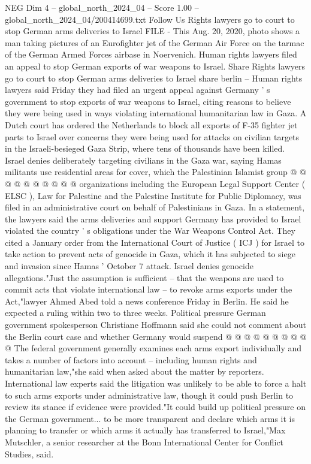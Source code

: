 \begin{textsample}{NEG Dim 4 – global\_north\_2024\_04 – Score 1.00 – global\_north\_2024\_04/200414699.txt}  \label{ex:f4_neg_095}
Follow Us Rights lawyers go to court to stop German arms deliveries to Israel FILE - This Aug. 20, 2020, photo shows a man taking pictures of an Eurofighter jet of the German Air Force on the tarmac of the German Armed Forces airbase in Noervenich.
Human rights lawyers filed an appeal to stop German exports of war weapons to Israel.
Share Rights lawyers go to court to stop German arms deliveries to Israel share berlin -- Human rights lawyers said Friday they had filed an urgent appeal against Germany ' s government to stop exports of war weapons to Israel, citing reasons to believe they were being used in ways violating international humanitarian law in Gaza.
A Dutch court has ordered the Netherlands to block all exports of F-35 fighter jet parts to Israel over concerns they were being used for attacks on civilian targets in the Israeli-besieged Gaza Strip, where tens of thousands have been killed.
Israel denies deliberately targeting civilians in the Gaza war, saying Hamas militants use residential areas for cover, which the Palestinian Islamist group @ @ @ @ @ @ @ @ @ @ organizations including the European Legal Support Center ( ELSC ), Law for Palestine and the Palestine Institute for Public Diplomacy, was filed in an administrative court on behalf of Palestinians in Gaza.
In a statement, the lawyers said the arms deliveries and support Germany has provided to Israel violated the country ' s obligations under the War Weapons Control Act.
They cited a January order from the International Court of Justice ( ICJ ) for Israel to take action to prevent acts of genocide in Gaza, which it has subjected to siege and invasion since Hamas ' October 7 attack.
Israel denies genocide allegations."Just the assumption is sufficient -- that the weapons are used to commit acts that violate international law -- to revoke arms exports under the Act,"lawyer Ahmed Abed told a news conference Friday in Berlin.
He said he expected a ruling within two to three weeks.
Political pressure German government spokesperson Christiane Hoffmann said she could not comment about the Berlin court case and whether Germany would suspend @ @ @ @ @ @ @ @ @ @ The federal government generally examines each arms export individually and takes a number of factors into account -- including human rights and humanitarian law,"she said when asked about the matter by reporters.
International law experts said the litigation was unlikely to be able to force a halt to such arms exports under administrative law, though it could push Berlin to review its stance if evidence were provided."It could build up political pressure on the German government... to be more transparent and declare which arms it is planning to transfer or which arms it actually has transferred to Israel,"Max Mutschler, a senior researcher at the Bonn International Center for Conflict Studies, said.

\end{textsample}
